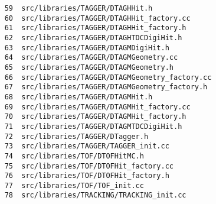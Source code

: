 \small
\begin{verbatim}
    59  src/libraries/TAGGER/DTAGHHit.h
    60  src/libraries/TAGGER/DTAGHHit_factory.cc
    61  src/libraries/TAGGER/DTAGHHit_factory.h
    62  src/libraries/TAGGER/DTAGHTDCDigiHit.h
    63  src/libraries/TAGGER/DTAGMDigiHit.h
    64  src/libraries/TAGGER/DTAGMGeometry.cc
    65  src/libraries/TAGGER/DTAGMGeometry.h
    66  src/libraries/TAGGER/DTAGMGeometry_factory.cc
    67  src/libraries/TAGGER/DTAGMGeometry_factory.h
    68  src/libraries/TAGGER/DTAGMHit.h
    69  src/libraries/TAGGER/DTAGMHit_factory.cc
    70  src/libraries/TAGGER/DTAGMHit_factory.h
    71  src/libraries/TAGGER/DTAGMTDCDigiHit.h
    72  src/libraries/TAGGER/DTagger.h
    73  src/libraries/TAGGER/TAGGER_init.cc
    74  src/libraries/TOF/DTOFHitMC.h
    75  src/libraries/TOF/DTOFHit_factory.cc
    76  src/libraries/TOF/DTOFHit_factory.h
    77  src/libraries/TOF/TOF_init.cc
    78  src/libraries/TRACKING/TRACKING_init.cc
\end{verbatim}
